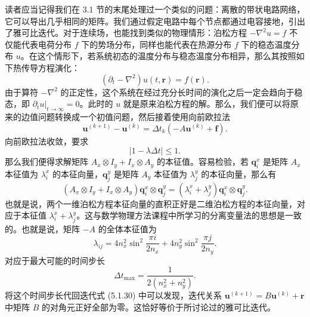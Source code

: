 读者应当记得我们在 3.1 节的末尾处理过一个类似的问题：离散的带状电路网络，它可以导出几乎相同的矩阵。我们通过假定电路中每个节点都通过电容接地，引出了雅可比迭代。对于连续场，也能找到类似的物理情形：泊松方程 $-\nabla^2u=f$ 不仅能代表电荷分布 $f$ 下的势场分布，同样也能代表在热源分布 $f$ 下的稳态温度分布 $u$。在这个情形下，若系统初态的温度分布与稳态温度分布相异，那么其按照如下热传导方程演化：
\begin{equation}
(\partial_t-\nabla^2)u(t,\bm r)=f(\bm r).
\tag{5.1.29}
\end{equation}
由于算符 $-\nabla^2$ 的正定性，这个系统在经过充分长时间的演化之后一定会趋向于稳态，即 $\partial_tu|_{t\to\infty}=0$。此时的 $u$ 就是原来泊松方程的解。那么，我们便可以将原来的边值问题转换成一个初值问题，然后接着使用向前欧拉法
\begin{equation}
\bm u^{(k+1)}-\bm u^{(k)}=\Delta t_k(-A\bm u^{(k)}+\bm f).
\tag{5.1.30}
\end{equation}
向前欧拉法收敛，要求
\[
|1-\lambda\Delta t|\le1.
\]
那么我们便得求解矩阵 $A_x\otimes I_y+I_x\otimes A_y$ 的本征值。容易检验，若 $\bm q_i^x$ 是矩阵 $A_x$ 本征值为 $\lambda_i^x$ 的本征向量，$\bm q_j^y$ 是矩阵 $A_y$ 本征值为 $\lambda_j^y$ 的本征向量，那么有
\begin{equation}
(A_x\otimes I_y+I_x\otimes A_y)\bm q_i^x\otimes\bm q_j^y=(\lambda_i^x+\lambda_j^y)\bm q_i^x\otimes\bm q_j^y.
\tag{5.1.31}
\end{equation}
也就是说，两个一维泊松方程本征向量的直积正好是二维泊松方程的本征向量，对应于本征值 $\lambda_i^x+\lambda_j^y$。这与数学物理方法课程中所学习的分离变量法的思想是一致的。也就是说，矩阵 $-A$ 的全体本征值为
\begin{equation}
\lambda_{ij}=4n_x^2\sin^2\frac{\pi i}{2n_x}+4n_y^2\sin^2\frac{\pi j}{2n_y}.
\tag{5.1.32}
\end{equation}
对应于最大可能的时间步长
\begin{equation}
\Delta t_{\max}=\frac1{2(n_x^2+n_y^2)}.
\tag{5.1.33}
\end{equation}
将这个时间步长代回迭代式 (5.1.30) 中可以发现，迭代关系 $\bm u^{(k+1)}=B\bm u^{(k)}+\bm r$ 中矩阵 $B$ 的对角元正好全部为零。这恰好等价于所讨论过的雅可比迭代。

